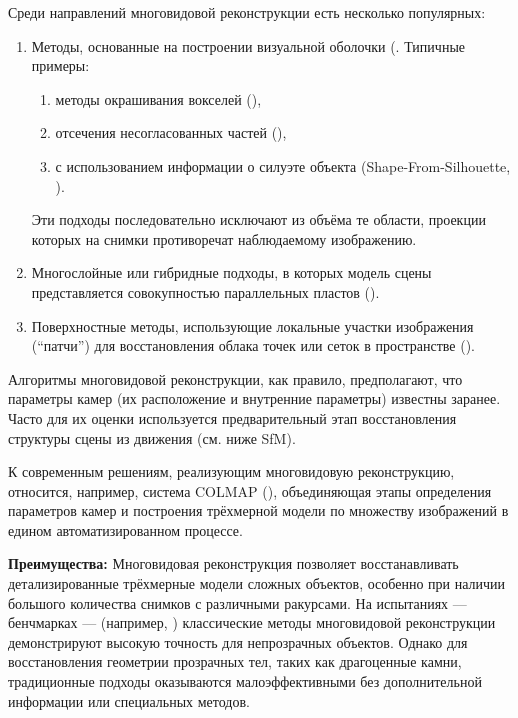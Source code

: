 Среди направлений многовидовой реконструкции есть несколько популярных:

\begin{enumerate}
	\item Методы, основанные на построении визуальной оболочки (\cite{10.1109/34.273735}.
	Типичные примеры:
	\begin{enumerate}
		\item методы окрашивания вокселей (\cite{10.5555/794189.794361}),
		\item отсечения несогласованных частей (\cite{10.5555/898435}),
		\item с использованием информации о силуэте объекта (Shape-From-Silhouette, \cite{Matusik2002VHull}).
	\end{enumerate}
	Эти подходы последовательно исключают из объёма те области, проекции которых
	на снимки противоречат наблюдаемому изображению.

	\item Многослойные или гибридные подходы, в которых модель сцены
	представляется совокупностью параллельных пластов (\cite{10.1109/CVPR.1998.698642}).

	\item Поверхностные методы, использующие локальные участки изображения
	(``патчи'') для восстановления облака точек или сеток в пространстве (\cite{10.1109/CVPR.2007.383246}).

\end{enumerate}

Алгоритмы многовидовой реконструкции, как правило, предполагают, что параметры
камер (их расположение и внутренние параметры) известны заранее. Часто для их
оценки используется предварительный этап восстановления структуры сцены из
движения (см. ниже SfM).

К современным решениям, реализующим многовидовую реконструкцию,
относится, например, система COLMAP (\cite{schoenberger2016mvs}), объединяющая этапы определения параметров
камер и построения трёхмерной модели по множеству изображений в едином
автоматизированном процессе.

\textbf{Преимущества:} Многовидовая реконструкция позволяет восстанавливать
детализированные трёхмерные модели сложных объектов, особенно при наличии
большого количества снимков с различными ракурсами. На испытаниях — бенчмарках —
(например, \cite{Knapitsch2017}) классические методы многовидовой реконструкции
демонстрируют высокую точность для непрозрачных объектов. Однако для
восстановления геометрии прозрачных тел, таких как драгоценные камни,
традиционные подходы оказываются малоэффективными без дополнительной информации
или специальных методов.

